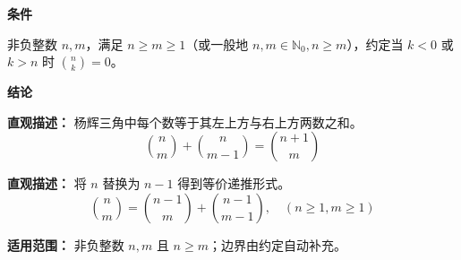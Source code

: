 \begin{statementbox}
	\textbf{\textcolor{CStatement}{条件}}
	\begin{description}[style=nextline, leftmargin=2.8em, labelsep=0.5em, itemsep=0.35em]
		\item[\textbf{\textcolor{CStatement}{条件 1（非负整数）：}}] 非负整数 $n,m$，满足 $n \geq m \geq 1$（或一般地 $n,m \in \mathbb{N}_0, n \geq m$），约定当 $k<0$ 或 $k>n$ 时 $\binom{n}{k}=0$。
	\end{description}

	\textbf{\textcolor{CStatement}{结论}}
	\begin{description}[style=nextline, leftmargin=2.8em, labelsep=0.5em, itemsep=0.45em]
		\item[\textbf{\textcolor{CStatement}{结论一（递推公式）：}}]
			\textbf{\textcolor{CStatement}{直观描述：}}
			杨辉三角中每个数等于其左上方与右上方两数之和。
			\[
				\binom{n}{m} + \binom{n}{m-1} = \binom{n+1}{m}
			\]

		\item[\textbf{\textcolor{CStatement}{推广结论（降阶递推）：}}]
			\textbf{\textcolor{CStatement}{直观描述：}}
			将 $n$ 替换为 $n-1$ 得到等价递推形式。
			\[
				\binom{n}{m} = \binom{n-1}{m} + \binom{n-1}{m-1}, \quad (n \geq 1, m \geq 1)
			\]
	\end{description}

	\textbf{\textcolor{CStatement}{适用范围：}}
	非负整数 $n,m$ 且 $n \geq m$；边界由约定自动补充。
\end{statementbox}
